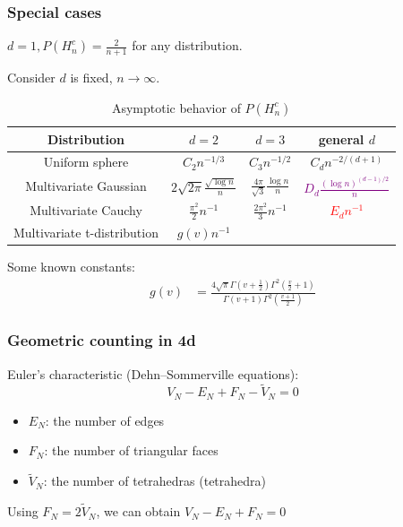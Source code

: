 \documentclass{beamer}
\begin{document}
\begin{frame}
    \frametitle{Special cases}
    $d=1,P(H_n^c) = \frac{2}{n+1}$ for any distribution.
    
    Consider $d$ is fixed, $n\to \infty$.
    \begin{table}
        \begin{tabular}{|c|c|c|c|}
            \hline
            Distribution & $d=2$ & $d=3$ &  general $d$ \\
            \hline
            Uniform sphere & $C_2 n^{-1/3}$ & $C_3 n^{-1/2}$ &
            $C_{d} n^{-2/(d+1)}$ \\
            \hline
            Multivariate Gaussian &
            $2\sqrt{2\pi}\frac{\sqrt{\log n}}{n}$
            & $\frac{4\pi}{\sqrt{3}}\frac{\log n}{n}$
            & 
            \textcolor{purple}{$D_d\frac{(\log n)^{(d-1)/2}}{n}$} \\
            \hline
            Multivariate Cauchy & 
            $\frac{\pi^2}{2}n^{-1}$ &
            $\frac{2\pi^2}{3}n^{-1}$ &
            \textcolor{red}{$E_d n^{-1}$}\\
            \hline
            Multivariate t-distribution &
            $g(v) n^{-1}$ & & \\
            \hline
        \end{tabular}
        \caption{Asymptotic behavior of $P(H_n^c)$}
    \end{table}
    Some known constants:
    \begin{align*}
    g(v) &= \frac{4\sqrt{\pi}
    \Gamma(v+\frac{1}{2})\Gamma^2\left(\frac{v}{2}+1\right)}
    {\Gamma(v+1)\Gamma^2 \left(\frac{v+1}{2} \right)}
    \end{align*}
\end{frame}

\begin{frame}
    \frametitle{Geometric counting in 4d}
    Euler's characteristic (Dehn–Sommerville equations):
    \begin{equation}
        V_N - E_N + F_N - \widetilde{V}_N = 0
    \end{equation}   
    \begin{itemize}
        \item $E_N$: the number of edges
        \item $F_N$: the number of triangular faces
        \item $\widetilde{V}_N$: the number of tetrahedras (tetrahedra)
    \end{itemize}    
    Using $F_N = 2 \widetilde{V}_N$,
    we can obtain $V_N - E_N + F_N = 0$
\end{frame}
\end{document}
